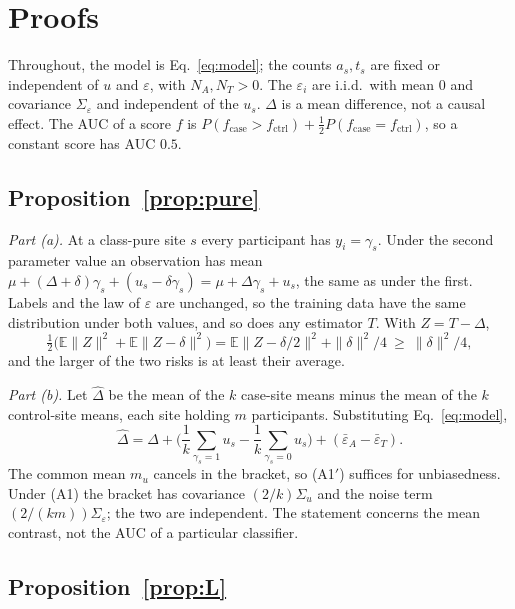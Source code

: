 \section{Proofs}\label{app:proofs}

Throughout, the model is Eq.~\eqref{eq:model}; the counts $a_s,t_s$ are fixed or independent of $u$ and $\varepsilon$, with $N_A,N_T>0$. The $\varepsilon_i$ are i.i.d.\ with mean $0$ and covariance $\Sigma_\varepsilon$ and independent of the $u_s$. $\Delta$ is a mean difference, not a causal effect. The AUC of a score $f$ is $P(f_{\mathrm{case}}>f_{\mathrm{ctrl}})+\tfrac12P(f_{\mathrm{case}}=f_{\mathrm{ctrl}})$, so a constant score has AUC $0.5$.

\subsection{Proposition~\ref{prop:pure}}

\emph{Part (a).} At a class-pure site $s$ every participant has $y_i=\gamma_s$. Under the second parameter value an observation has mean $\mu+(\Delta+\delta)\gamma_s+(u_s-\delta\gamma_s)=\mu+\Delta\gamma_s+u_s$, the same as under the first. Labels and the law of $\varepsilon$ are unchanged, so the training data have the same distribution under both values, and so does any estimator $T$. With $Z=T-\Delta$,
\[
\tfrac12\big(\mathbb{E}\|Z\|^2+\mathbb{E}\|Z-\delta\|^2\big)=\mathbb{E}\|Z-\delta/2\|^2+\|\delta\|^2/4\ \ge\ \|\delta\|^2/4,
\]
and the larger of the two risks is at least their average.

\emph{Part (b).} Let $\hat\Delta$ be the mean of the $k$ case-site means minus the mean of the $k$ control-site means, each site holding $m$ participants. Substituting Eq.~\eqref{eq:model},
\[
\hat\Delta=\Delta+\Big(\frac1k\sum_{\gamma_s=1}u_s-\frac1k\sum_{\gamma_s=0}u_s\Big)+(\bar\varepsilon_A-\bar\varepsilon_T).
\]
The common mean $m_u$ cancels in the bracket, so (A1$'$) suffices for unbiasedness. Under (A1) the bracket has covariance $(2/k)\Sigma_u$ and the noise term $(2/(km))\Sigma_\varepsilon$; the two are independent. The statement concerns the mean contrast, not the AUC of a particular classifier.

\subsection{Proposition~\ref{prop:L}}

